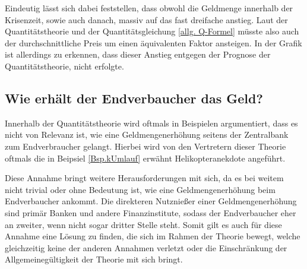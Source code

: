 Eindeutig lässt sich dabei feststellen, dass obwohl die Geldmenge innerhalb der Krisenzeit, sowie auch danach, massiv auf das fast dreifache anstieg. Laut der Quantitätstheorie und der Quantitätsgleichung \vref{allg. Q-Formel} müsste also auch der durchschnittliche Preis um einen äquivalenten Faktor ansteigen. In der Grafik ist allerdings zu erkennen, dass dieser Anstieg entgegen der Prognose der Quantitätstheorie, nicht erfolgte.

\subsection{Wie erhält der Endverbaucher das Geld?}

Innerhalb der Quantitätstheorie wird oftmals in Beispielen argumentiert, dass es nicht von Relevanz ist, wie eine Geldmengenerhöhung seitens der Zentralbank zum Endverbraucher gelangt. Hierbei wird von den Vertretern dieser Theorie oftmals die in Beipsiel \vref{Bsp.kUmlauf} erwähnt Helikopteranekdote angeführt.


Diese Annahme bringt weitere Herausforderungen mit sich, da es bei weitem nicht trivial oder ohne Bedeutung ist, wie eine Geldmengenerhöhung beim Endverbaucher ankommt. Die direkteren Nutznießer einer Geldmengenerhöhung sind primär Banken und andere Finanzinstitute, sodass der Endverbaucher eher an zweiter, wenn nicht sogar dritter Stelle steht. Somit gilt es auch für diese Annahme eine Lösung zu finden, die sich im Rahmen der Theorie bewegt, welche gleichzeitig keine der anderen Annahmen verletzt oder die Einschränkung der Allgemeinegültigkeit der Theorie mit sich bringt.
